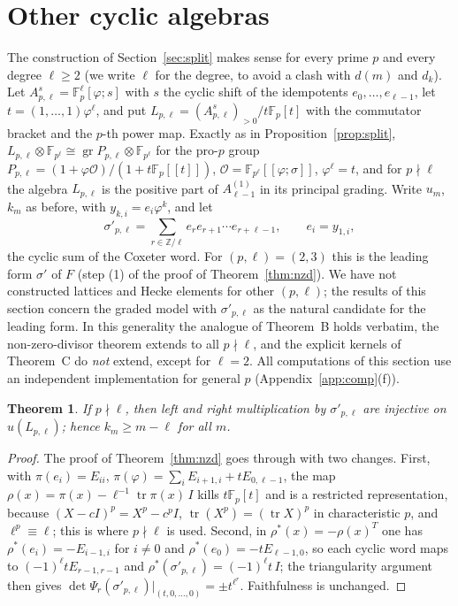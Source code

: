 \documentclass[11pt]{amsart}
\newtheorem{theorem}{Theorem}[section]
\theoremstyle{definition}
\newcommand{\F}{\mathbb{F}}
\newcommand{\Z}{\mathbb{Z}}
\newcommand{\gr}{\operatorname{gr}}
\begin{document}
\section{Other cyclic algebras}\label{sec:family}

The construction of Section~\ref{sec:split} makes sense for every prime $p$ and every degree $\ell\ge2$ (we write $\ell$
for the degree, to avoid a clash with $d(m)$ and $d_k$). Let $A^s_{p,\ell}=\F_p^{\ell}[\varphi;s]$ with $s$ the cyclic
shift of the idempotents $e_0,\dots,e_{\ell-1}$, let $t=(1,\dots,1)\varphi^\ell$, and put
$L_{p,\ell}=(A^s_{p,\ell})_{>0}/t\F_p[t]$ with the commutator bracket and the $p$-th power map. Exactly as in
Proposition~\ref{prop:split}, $L_{p,\ell}\otimes\F_{p^\ell}\cong\gr P_{p,\ell}\otimes\F_{p^\ell}$ for the pro-$p$ group
$P_{p,\ell}=(1+\varphi\mathcal O)/(1+t\F_p[[t]])$, $\mathcal O=\F_{p^\ell}[[\varphi;\sigma]]$, $\varphi^\ell=t$, and for
$p\nmid\ell$ the algebra $L_{p,\ell}$ is the positive part of $A_{\ell-1}^{(1)}$ in its principal grading. Write $u_m$,
$k_m$ as before, with $y_{k,i}=e_i\varphi^k$, and let
\[
  \sigma'_{p,\ell}=\sum_{r\in\Z/\ell}e_re_{r+1}\cdots e_{r+\ell-1},\qquad e_i=y_{1,i},
\]
the cyclic sum of the Coxeter word. For $(p,\ell)=(2,3)$ this is the leading form $\sigma'$ of $F$ (step (1) of the proof
of Theorem~\ref{thm:nzd}). We have not constructed lattices and Hecke elements for other $(p,\ell)$; the results of this
section concern the graded model with $\sigma'_{p,\ell}$ as the natural candidate for the leading form. In this
generality the analogue of Theorem~B holds verbatim, the non-zero-divisor theorem extends to all $p\nmid\ell$, and the
explicit kernels of Theorem~C do \emph{not} extend, except for $\ell=2$.
All computations of this section use an independent implementation for general $p$ (Appendix~\ref{app:comp}(f)).

\begin{theorem}\label{thm:famnzd}
If $p\nmid\ell$, then left and right multiplication by $\sigma'_{p,\ell}$ are injective on $u(L_{p,\ell})$; hence
$k_m\ge m-\ell$ for all $m$.
\end{theorem}

\begin{proof}
The proof of Theorem~\ref{thm:nzd} goes through with two changes. First, with
$\pi(e_i)=E_{ii}$, $\pi(\varphi)=\sum_iE_{i+1,i}+tE_{0,\ell-1}$, the map $\rho(x)=\pi(x)-\ell^{-1}\operatorname{tr}\pi(x)\,I$
kills $t\F_p[t]$ and is a restricted representation, because $(X-cI)^p=X^p-c^pI$, $\operatorname{tr}(X^p)=(\operatorname{tr}X)^p$
in characteristic $p$, and $\ell^p\equiv\ell$; this is where $p\nmid\ell$ is used. Second, in
$\rho^*(x)=-\rho(x)^T$ one has $\rho^*(e_i)=-E_{i-1,i}$ for $i\ne0$ and $\rho^*(e_0)=-tE_{\ell-1,0}$, so each cyclic word
maps to $(-1)^\ell tE_{r-1,r-1}$ and $\rho^*(\sigma'_{p,\ell})=(-1)^\ell t\,I$; the triangularity argument then gives
$\det\Psi_r(\sigma'_{p,\ell})|_{(t,0,\dots,0)}=\pm t^{\ell^r}$. Faithfulness is unchanged.
\end{proof}
\end{document}
